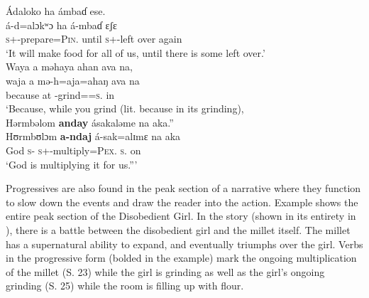 \medskip
Ádaloko  ha  ámbaɗ  ese.\\ 
\gll  á-d=alɔkʷɔ  ha á-mbaɗ ɛʃɛ\\
      \textsc{s}+{\IFV}-prepare=\textsc{Pin}.{\IO}  until  {\textsc{s}+{\IFV}-left over}  again\\
\glt  ‘It will make food for all of us, until there is some left over.’\\

\medskip
 Waya  a  məhaya  ahan  ava  na,\\  
\gll  waja a mə-h=aja=ahaŋ ava na\\
      because  at   {\NOM}{}-grind={\PLU}=\textsc{s}.{\POSS}   in   {\PSP}\\
\glt  ‘Because, while you grind (lit. because in its grinding),\\

\medskip
\largerpage
Hərmbəlom  \textbf{anday}   ásakaləme  na  aka.”\\
\gll  Hʊrmbʊlɔm \textbf{a-ndaj}  á-sak=alɪmɛ na aka\\
      God            \textsc{s}-{\PROG}   \textsc{s}+{\IFV}-multiply=\textsc{Pex}.{\IO}   \textsc{s}.{\DO}   on\\
\glt  ‘God is multiplying it for us.”’
\z

Progressives are also found in the peak section of a narrative where they function to slow down the events and draw the reader into the action. Example  shows the entire peak section of the Disobedient Girl. In the story (shown in its entirety in ), there is a battle between the disobedient girl and the millet itself. The millet has a supernatural ability to expand, and eventually triumphs over the girl. Verbs in the progressive form (bolded in the example) mark the ongoing multiplication of the millet (S. 23) while the girl is grinding as well as the girl’s ongoing grinding (S. 25) while the room is filling up with flour. 


